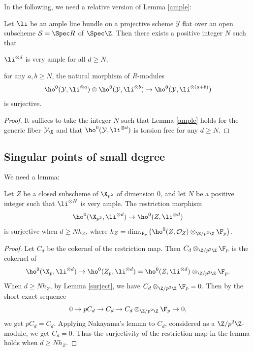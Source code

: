 In the following, we need a relative version of Lemma \ref{ample}:
\begin{lem}\label{relample}
Let $\li$ be an ample line bundle on a projective scheme $\mathcal{Y}$ flat over an open subscheme $\mathcal{S}=\Spec R$ of $\Spec \Z$.
Then there exists a positive integer $N$ such that
\begin{enumeratei}
\item $\li^{\otimes d}$ is very ample for all $d\geq N$;
\item for any $a, b\geq N$, the natural morphism of $R$-modules
\[
\ho^0(\mathcal{Y},\li^{\otimes a})\otimes \ho^0(\mathcal{Y},\li^{\otimes b})\to \ho^0(\mathcal{Y},\li^{\otimes (a+b)})
\]
is surjective.
\end{enumeratei}
\end{lem}
\begin{proof}
It suffices to take the integer $N$ such that Lemma \ref{ample} holds for the generic fiber $\mathcal{Y}_{\Q}$ and that $\ho^0(\mathcal{Y},\li^{\otimes d})$ is torsion free for any $d\geq N$.
\end{proof}

\subsection{Singular points of small degree}\label{step1}

We need a lemma:
\begin{lem}\label{sur}
Let $Z$ be a closed subscheme of $\X_{p^2}$ of dimension $0$, and let $N$ be a positive integer such that $\li^{\otimes N}$ is very ample.
The restriction morphism
\[
\ho^0(\X_{p^2}, \li^{\otimes d})\to \ho^0(Z, \li^{\otimes d})
\]
is surjective when $d\geq Nh_Z$, where $h_Z=\dim_{\F_p}\left(\ho^0(Z, \mathcal{O}_{Z})\otimes_{\Z/p^2\Z} \F_p\right)$.
\end{lem}
\begin{proof}
Let $C_d$ be the cokernel of the restriction map. Then $C_d\otimes_{\Z/p^2\Z}\F_{p}$ is the cokernel of
\[
\ho^0(\X_{p}, \li^{\otimes d})\to \ho^0(Z_p, \li^{\otimes d}) =\ho^0(Z, \li^{\otimes d}) \otimes_{\Z/p^2\Z} \F_p.
\]
When $d\geq Nh_Z$, by Lemma \ref{surject}, we have $C_d\otimes_{\Z/p^2\Z}\F_{p}=0$. Then by the short exact sequence
\[
0\to pC_d \to C_d \to C_d\otimes_{\Z/p^2\Z}\F_{p} \to 0,
\]
we get $pC_d=C_d$. Applying Nakayama's lemma to $C_d$, considered as a $\Z/p^2\Z$-module, we get $C_d=0$. Thus the surjectivity of the restriction map in the lemma holds when $d\geq Nh_Z$.
\end{proof}

